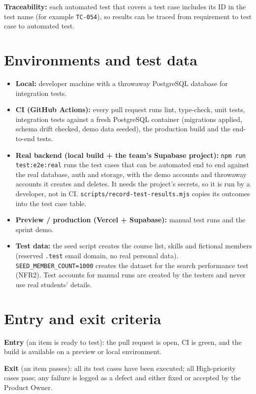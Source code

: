 \documentclass[10pt,a4paper]{article}
\begin{document}
\textbf{Traceability:} each automated test that covers a test case includes its ID in the test name (for example \texttt{TC-054}), so results can be traced from requirement to test case to automated test.

\section{Environments and test data}
\begin{itemize}
\item \textbf{Local:} developer machine with a throwaway PostgreSQL database for integration tests.
\item \textbf{CI (GitHub Actions):} every pull request runs lint, type-check, unit tests, integration tests against a fresh PostgreSQL container (migrations applied, schema drift checked, demo data seeded), the production build and the end-to-end tests.
\item \textbf{Real backend (local build + the team's Supabase project):} \texttt{npm run test:e2e:real} runs the test cases that can be automated end to end against the real database, auth and storage, with the demo accounts and throwaway accounts it creates and deletes. It needs the project's secrets, so it is run by a developer, not in CI. \texttt{scripts/record-test-results.mjs} copies its outcomes into the test case table.
\item \textbf{Preview / production (Vercel + Supabase):} manual test runs and the sprint demo.
\item \textbf{Test data:} the seed script creates the course list, skills and fictional members (reserved \texttt{.test} email domain, no real personal data). \texttt{SEED\_MEMBER\_COUNT=1000} creates the dataset for the search performance test (NFR2). Test accounts for manual runs are created by the testers and never use real students' details.
\end{itemize}

\section{Entry and exit criteria}
\textbf{Entry} (an item is ready to test): the pull request is open, CI is green, and the build is available on a preview or local environment.

\textbf{Exit} (an item passes): all its test cases have been executed; all High-priority cases pass; any failure is logged as a defect and either fixed or accepted by the Product Owner.
\end{document}
